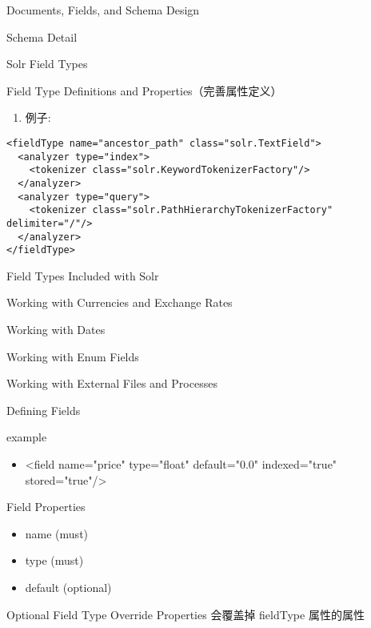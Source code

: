\documentclass[presentation]{beamer}
\begin{document}
\begin{frame}[fragile,label={sec:orgc0e77e6}]{Documents, Fields, and Schema Design}
\begin{block}{Schema Detail}
\begin{block}{Solr Field Types}
\begin{block}{Field Type Definitions and Properties（完善属性定义）}
\begin{enumerate}
\begin{itemize}
\begin{enumerate}
\begin{itemize}
\end{itemize}
\end{enumerate}
\end{itemize}
\item 例子:
\end{enumerate}
\begin{verbatim}
<fieldType name="ancestor_path" class="solr.TextField">
  <analyzer type="index">
    <tokenizer class="solr.KeywordTokenizerFactory"/>
  </analyzer>
  <analyzer type="query">
    <tokenizer class="solr.PathHierarchyTokenizerFactory" delimiter="/"/>
  </analyzer>
</fieldType>
\end{verbatim}
\end{block}

\begin{block}{Field Types Included with Solr}
\end{block}
\begin{block}{Working with Currencies and Exchange Rates}
\end{block}
\begin{block}{Working with Dates}
\end{block}
\begin{block}{Working with Enum Fields}
\end{block}
\begin{block}{Working with External Files and Processes}
\end{block}
\end{block}


\begin{block}{Defining Fields}
\begin{block}{example}
\begin{itemize}
\item <field name="price" type="float" default="0.0" indexed="true" stored="true"/>
\end{itemize}
\end{block}

\begin{block}{Field Properties}
\begin{itemize}
\item name (must)
\item type (must)
\item default (optional)
\end{itemize}
\end{block}

\begin{block}{Optional Field Type Override Properties}
会覆盖掉 fieldType 属性的属性
\end{block}
\end{block}



\end{block}
\end{frame}
\end{document}
